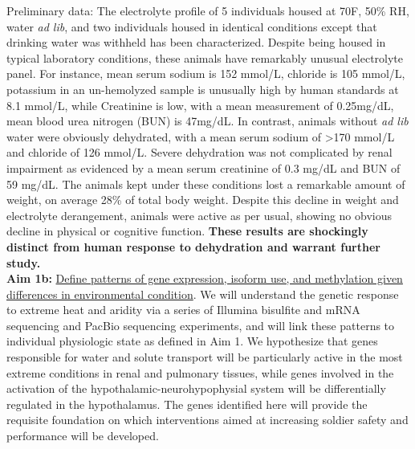 \documentclass[12pt]{article}
\begin{document}
Preliminary data: The electrolyte profile of 5 individuals housed at 70F, 50\% RH, water \textit{ad lib}, and two individuals housed in identical conditions except that drinking water was withheld has been characterized. Despite being housed in typical laboratory conditions, these animals have remarkably unusual electrolyte panel. For instance, mean serum sodium is 152 mmol/L, chloride is 105 mmol/L, potassium in an un-hemolyzed sample is unusually high by human standards at 8.1 mmol/L, while Creatinine is low, with a mean measurement of 0.25mg/dL, mean blood urea nitrogen (BUN) is 47mg/dL. In contrast, animals without \textit{ad lib} water were obviously dehydrated, with a mean serum sodium of \textgreater 170 mmol/L and chloride of 126 mmol/L. Severe dehydration was not complicated by renal impairment as evidenced by a mean serum creatinine of 0.3 mg/dL and BUN of 59 mg/dL. The animals kept under these conditions lost a remarkable amount of weight, on average 28\% of total body weight. Despite this decline in weight and electrolyte derangement, animals were active as per usual, showing no obvious decline in physical or cognitive function. \textbf{These results are shockingly distinct from human response to dehydration and warrant further study.}  \\  

\noindent \textbf{Aim 1b:} \ul{Define patterns of gene expression, isoform use, and methylation given differences in environmental condition}. {We will understand the genetic response to extreme heat and aridity via a series of Illumina bisulfite and mRNA sequencing and PacBio sequencing experiments, and will link these patterns to individual physiologic state as defined in Aim 1.} We hypothesize that genes responsible for water and solute transport will be particularly active in the most extreme conditions in renal and pulmonary tissues, while genes involved in the activation of the hypothalamic-neurohypophysial system will be differentially regulated in the hypothalamus. The genes identified here will provide the requisite foundation on which interventions aimed at increasing soldier safety and performance will be developed. \\
\end{document}
